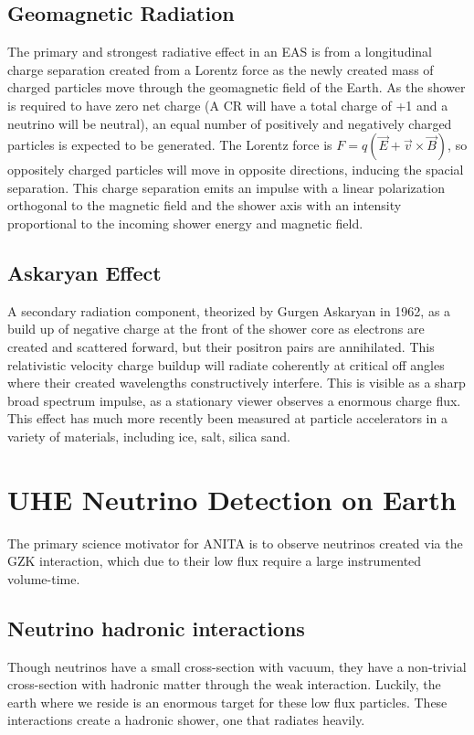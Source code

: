 	\subsection{Geomagnetic Radiation}
		The primary and strongest radiative effect in an EAS is from a longitudinal charge separation created from a Lorentz force as the newly created mass of charged particles move through the geomagnetic field of the Earth.  As the shower is required to have zero net charge (A CR will have a total charge of +1 and a neutrino will be neutral), an equal number of positively and negatively charged particles is expected to be generated.  The Lorentz force is $F=q(\vec{E}+\vec{v}\times\vec{B})$, so oppositely charged particles will move in opposite directions, inducing the spacial separation.  This charge separation emits an impulse with a linear polarization orthogonal to the magnetic field and the shower axis with an intensity proportional to the incoming shower energy and magnetic field.
	\subsection{Askaryan Effect}
		A secondary radiation component, theorized by Gurgen Askaryan in 1962, as a build up of negative charge at the front of the shower core as electrons are created and scattered forward, but their positron pairs are annihilated.\cite{Askaryan:1962hbi}  This relativistic velocity charge buildup will radiate coherently at critical off angles where their created wavelengths constructively interfere.  This is visible as a sharp broad spectrum impulse, as a stationary viewer observes a enormous charge flux.  This effect has much more recently been measured at particle accelerators in a variety of materials, including ice,\cite{PhysRevLett.99.171101} salt\cite{PhysRevD.72.023002}, silica sand\cite{PhysRevLett.86.2802}.  

\section{UHE Neutrino Detection on Earth}
	The primary science motivator for ANITA is to observe neutrinos created via the GZK interaction, which due to their low flux require a large instrumented volume-time.  
	\subsection{Neutrino hadronic interactions}
		Though neutrinos have a small cross-section with vacuum, they have a non-trivial cross-section with hadronic matter through the weak interaction.  Luckily, the earth where we reside is an enormous target for these low flux particles.  These interactions create a hadronic shower, one that radiates heavily.

